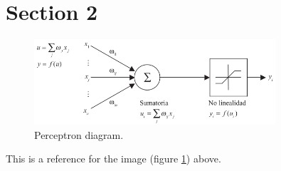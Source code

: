 \documentclass{article} %
\begin{document}
\cleardoublepage

\section{Section 2} %

\begin{figure}[H]
	\centering
	\includegraphics[width=0.8\textwidth]{images/perceptron-graph}
	\caption{Perceptron diagram.}
	\label{fig:perceptron-graph}
\end{figure}

This is a reference for the image (figure \ref{fig:perceptron-graph}) above.
\end{document}
